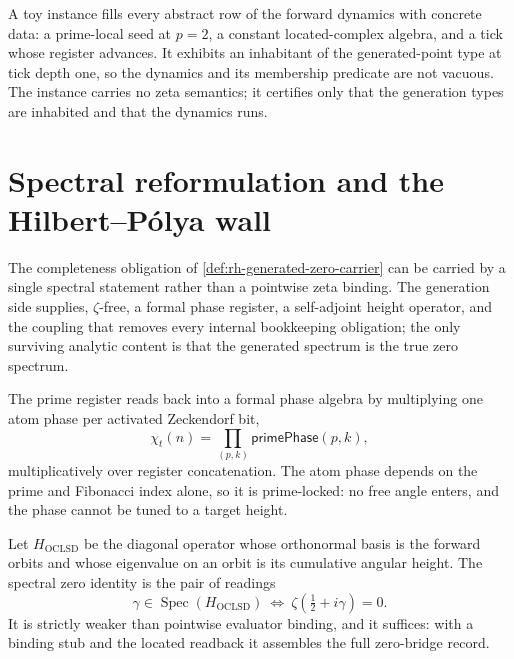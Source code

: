 \begin{remark}
\label{rem:rh-generation-nonvacuity}
A toy instance fills every abstract row of the forward dynamics with concrete
data: a prime-local seed at $p=2$, a constant located-complex algebra, and a
tick whose register advances. It exhibits an inhabitant of the generated-point
type at tick depth one, so the dynamics and its membership predicate are not
vacuous. The instance carries no zeta semantics; it certifies only that the
generation types are inhabited and that the dynamics runs.
\end{remark}

\section{Spectral reformulation and the Hilbert--P\'olya wall}
\label{sec:rh-generation-spectral-reformulation}

The completeness obligation of \autoref{def:rh-generated-zero-carrier} can be
carried by a single spectral statement rather than a pointwise zeta binding. The
generation side supplies, $\zeta$-free, a formal phase register, a self-adjoint height
operator, and the coupling that removes every internal bookkeeping obligation; the
only surviving analytic content is that the generated spectrum is the true zero
spectrum.

\begin{principle}
\label{prin:rh-generation-prime-phase}
The prime register reads back into a formal phase algebra by multiplying one atom
phase per activated Zeckendorf bit,
$$
\chi_t(n)=\prod_{(p,k)}\mathsf{primePhase}(p,k),
$$
multiplicatively over register concatenation. The atom phase depends on the prime
and Fibonacci index alone, so it is prime-locked: no free angle enters, and the
phase cannot be tuned to a target height.
\end{principle}

\begin{definition}
\label{def:rh-generation-spectral-identity}
Let $H_{\mathrm{OCLSD}}$ be the diagonal operator whose orthonormal basis is the
forward orbits and whose eigenvalue on an orbit is its cumulative angular height.
The spectral zero identity is the pair of readings
$$
\gamma\in\operatorname{Spec}(H_{\mathrm{OCLSD}})\ \Longleftrightarrow\ \zeta(\tfrac12+i\gamma)=0.
$$
It is strictly weaker than pointwise evaluator binding, and it suffices: with a
binding stub and the located readback it assembles the full zero-bridge record.
\end{definition}


